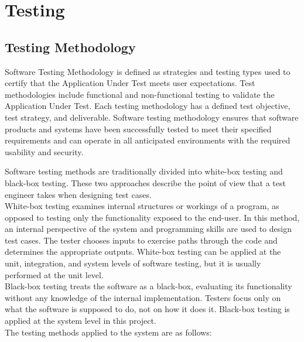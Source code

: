 \documentclass[11pt]{report}
\begin{document}
\chapter{Testing}

\section{Testing Methodology}
Software Testing Methodology is defined as strategies and testing types used to certify that the Application Under Test meets user expectations. Test methodologies include functional and non-functional testing to validate the Application Under Test. Each testing methodology has a defined test objective, test strategy, and deliverable. Software testing methodology ensures that software products and systems have been successfully tested to meet their specified requirements and can operate in all anticipated environments with the required usability and security.

Software testing methods are traditionally divided into white-box testing and black-box testing. These two approaches describe the point of view that a test engineer takes when designing test cases. \\

White-box testing examines internal structures or workings of a program, as opposed to testing only the functionality exposed to the end-user. In this method, an internal perspective of the system and programming skills are used to design test cases. The tester chooses inputs to exercise paths through the code and determines the appropriate outputs. White-box testing can be applied at the unit, integration, and system levels of software testing, but it is usually performed at the unit level. \\

Black-box testing treats the software as a black-box, evaluating its functionality without any knowledge of the internal implementation. Testers focus only on what the software is supposed to do, not on how it does it. Black-box testing is applied at the system level in this project. \\

The testing methods applied to the system are as follows:
\end{document}
